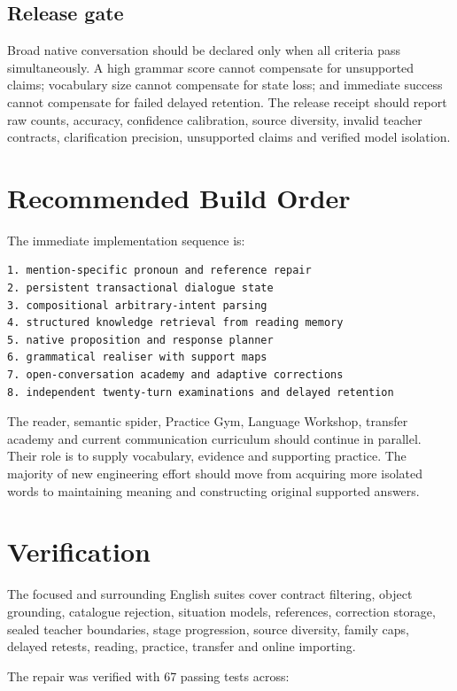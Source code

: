 \documentclass[11pt,a4paper]{article}
\begin{document}
\subsection{Release gate}

Broad native conversation should be declared only when all criteria pass simultaneously.  A high
grammar score cannot compensate for unsupported claims; vocabulary size cannot compensate for
state loss; and immediate success cannot compensate for failed delayed retention.  The release
receipt should report raw counts, accuracy, confidence calibration, source diversity, invalid
teacher contracts, clarification precision, unsupported claims and verified model isolation.

\section{Recommended Build Order}

The immediate implementation sequence is:

\begin{lstlisting}
1. mention-specific pronoun and reference repair
2. persistent transactional dialogue state
3. compositional arbitrary-intent parsing
4. structured knowledge retrieval from reading memory
5. native proposition and response planner
6. grammatical realiser with support maps
7. open-conversation academy and adaptive corrections
8. independent twenty-turn examinations and delayed retention
\end{lstlisting}

The reader, semantic spider, Practice Gym, Language Workshop, transfer academy and current
communication curriculum should continue in parallel.  Their role is to supply vocabulary,
evidence and supporting practice.  The majority of new engineering effort should move from
acquiring more isolated words to maintaining meaning and constructing original supported answers.

\section{Verification}

The focused and surrounding English suites cover contract filtering, object grounding, catalogue
rejection, situation models, references, correction storage, sealed teacher boundaries, stage
progression, source diversity, family caps, delayed retests, reading, practice, transfer and
online importing.

The repair was verified with 67 passing tests across:
\end{document}
